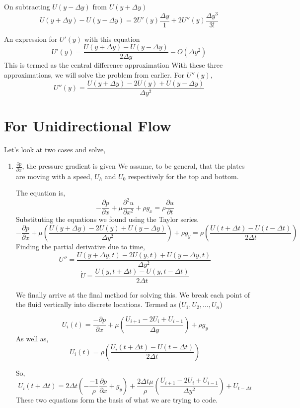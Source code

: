 \documentclass{report}
\begin{document}
On subtracting $U(y-\Delta y)$ from $U(y+\Delta y)$
\[
  U(y + \Delta y) - U(y - \Delta y) = 2 U'(y) \frac{\Delta y}{1} + 2U''(y)\frac{\Delta y^3}{3!}
\]

An expression for $U'(y)$ with this equation
\[
  U'(y) = \frac{U(y + \Delta y) - U(y - \Delta y)}{2 \Delta y} - O(\Delta y^2) 
\]
This is termed as the central difference approximation
With these three approximations, we will solve the problem from earlier.
For $U''(y)$,
\[
U''(y) = \frac{U(y+\Delta y) - 2U(y) + U(y-\Delta y)}{\Delta y^2}
\]

\section{For Unidirectional Flow}
Let's look at two cases and solve,
\begin{enumerate}
  \item $\frac{\partial p}{\partial x}$, the pressure gradient is given
    We assume, to be general, that the plates are moving with a speed, $U_h$ and $U_0$ respectively for the top and bottom.

    The equation is,
    \[
      -\frac{\partial p}{\partial x} + \mu \frac{\partial^2 u}{\partial x^2} + \rho g_x = \rho \frac{\partial u}{\partial t}
    \]
    Substituting the equations we found using the Taylor series.
    \[
      -\frac{\partial p}{\partial x} + \mu(\frac{U(y+\Delta y) - 2U(y) + U(y-\Delta y)}{\Delta y^2}) + \rho g_y = \rho(\frac{U(t + \Delta t) - U(t-\Delta t)}{2\Delta t})
    \]
    Finding the partial derivative due to time,
    \[
      U'' = \frac{U(y+\Delta y, t)-2U(y,t) + U(y-\Delta y, t)}{\Delta y^2}
    \]
    \[
      \dot{U} = \frac{U(y, t+ \Delta t) - U(y,t - \Delta t)}{2\Delta t}
    \]

    We finally arrive at the final method for solving this. We break each point of the fluid vertically into discrete locations. Termed as ($U_1, U_2,\dots, U_n$)

    \[
      U_i(t) = \frac{-\partial p}{\partial x} + \mu(\frac{U_{i+1} - 2U_{i} + U_{i-1}}{\Delta y}) + \rho g_y
    \]
    As well as,
    \[
      U_i(t) = \rho(\frac{U_i(t + \Delta t)-U(t-\Delta t)}{2\Delta t})
    \]

    So,
    \[
    U_{i}(t+\Delta t) = 2\Delta t (-\frac{-1}{\rho} \frac{\partial p}{\partial x} + g_y) + \frac{2 \Delta t \mu}{\rho}(\frac{U_{i+1} - 2U_i + U_{i-1}}{\Delta y^2}) + U_{t - \Delta t}
    \]
  These two equations form the basis of what we are trying to code.


\end{enumerate}
\end{document}
